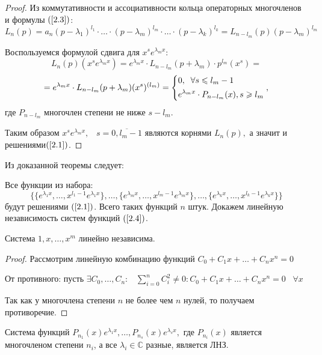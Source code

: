 \begin{proof}
    Из коммутативности и ассоциативности кольца операторных многочленов и формулы $(\ref{2.3})$: $L_n(p)=a_n(p-\lambda_1)^{l_1}\cdot \dots \cdot (p-\lambda_m)^{l_m}\cdot \dots \cdot (p-\lambda_k)^{l_k}=L_{n-l_m}(p)(p-\lambda_m)^{l_m}$\par
    Воспользуемся формулой сдвига для $x^se^{\lambda_m x}:$
    $$L_n(p)(x^se^{\lambda_m x})=e^{\lambda_m x}\cdot L_{n-l_m}(p+\lambda_m) \cdot p^{l_m}(x^s)=$$
    $$=e^{\lambda_m x}\cdot L_{n-l_m}(p+\lambda_m)(x^s)^{(l_m)}=\left\{
    \begin{gathered}
        0, \;\;\forall s\leqslant l_m-1\hfill
        \\
        e^{\lambda_m x}\cdot P_{n-l_m}(x), s\geqslant l_m \hfill
        \\
    \end{gathered}
    \right.,$$
    где $P_{n-l_m}$ многочлен степени не ниже $s-l_m$.\par
    Таким образом $x^se^{\lambda_{m} x}, \;\;\;s=\overline{0, l_{m}-1}$ являются корнями $L_n(p),$ а значит и решениями$(\ref{2.1})$.
\end{proof}

Из доказанной теоремы следует:
\par
Все функции из набора:
\begin{equation}
\tag{2.4}
\label{2.4}
    \Bigg\{\{e^{\lambda_1 x}, \dots, x^{l_1-1}e^{\lambda_1 x}\}, \dots, \{e^{\lambda_mx}, \dots, x^{l_m-1 }e^{\lambda_mx}\}, \dots, \{e^{\lambda_k x}, \dots, x^{l_k-1}e^{\lambda_k x}\}\Bigg\}
\end{equation}
будут решениями $(\ref{2.1})$. Всего таких функций $n$ штук. Докажем линейную независимость систем функций $(\ref{2.4})$.

\begin{lemma}\label{lem1}
    Система $1, x, \dots, x^m$ линейно независима. 
\end{lemma}

\begin{proof}
    Рассмотрим линейную комбинацию функций $C_0+C_1x+\dots+C_nx^n=0$\par От противного: пусть $\exists C_0, \dots, C_n:\;\;\;\displaystyle\sum_{i=0}^n C_i^2\neq0: C_0+C_1x+\dots+C_nx^n=0\;\;\;\forall x $\par Так как у многочлена степени $n$ не более чем $n$ нулей, то получаем противоречие.
\end{proof}

\begin{theorem}
    Система функций $P_{n_1}(x)e^{\lambda_1 x},\dots, P_{n_s}(x)e^{\lambda_s x}, $ где $P_{n_i}(x)$ является многочленом степени $n_i$,  а все $\lambda_i \in \mathds{C}$ разные, является ЛНЗ.
\end{theorem}

